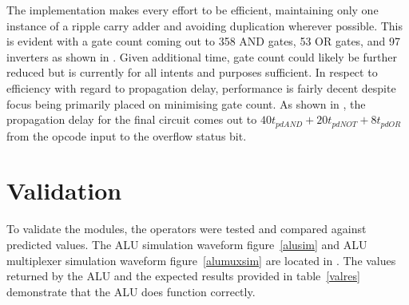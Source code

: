 \documentclass[12pt,letterpaper,titlepage]{article}
\begin{document}
\begin{raggedright}
The implementation makes every effort to be efficient, maintaining only one instance of a ripple carry adder and avoiding duplication wherever possible. This is evident with a gate count coming out to 358 AND gates, 53 OR gates, and 97 inverters as shown in . Given additional time, gate count could likely be further reduced but is currently for all intents and purposes sufficient. In respect to efficiency with regard to propagation delay, performance is fairly decent despite focus being primarily placed on minimising gate count. As shown in , the propagation delay for the final circuit comes out to $40t_{pdAND}+20t_{pdNOT} +8t_{pdOR}$ from the opcode input to the overflow status bit. 


\section{Validation}
To validate the modules, the operators were tested and compared against predicted values. The ALU simulation waveform figure~\ref{alusim} and ALU multiplexer simulation waveform figure~\ref{alumuxsim} are located in . The values returned by the ALU and the expected results provided in table~\ref{valres} demonstrate that the ALU does function correctly. 


\end{raggedright}
\end{document}
